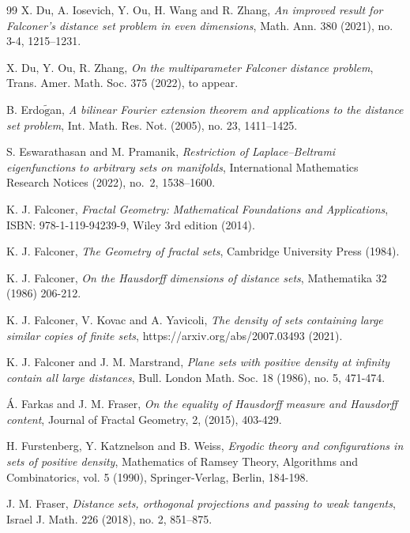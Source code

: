 \documentclass[a4paper,11pt]{amsart}
\numberwithin{equation}{section}
\begin{document}
\begin{thebibliography}{99}
 X. Du, A. Iosevich, Y. Ou, H. Wang and R. Zhang, {\em{An improved result for Falconer's distance set problem in even dimensions}}, Math. Ann. 380 (2021), no. 3-4, 1215–1231. 

 X. Du, Y. Ou, R. Zhang, \textit{On the multiparameter Falconer distance problem}, Trans. Amer. Math. Soc. 375 (2022), to appear. 

 B. Erdo$\tilde{\text{g}}$an, \textit{A bilinear Fourier extension theorem and applications to the distance set problem}, 
Int. Math. Res. Not. (2005), no. 23, 1411–1425. 

 S. Eswarathasan and M. Pramanik, \textit{Restriction of Laplace–Beltrami eigenfunctions to arbitrary sets on manifolds}, International Mathematics Research Notices  (2022), no.~2, 1538–1600.

 K. J. Falconer, \textit{Fractal Geometry: Mathematical Foundations and Applications}, ISBN: 978-1-119-94239-9, Wiley 3rd edition (2014). 

 K. J. Falconer, \textit{The Geometry of fractal sets}, Cambridge University Press (1984). 

 K. J. Falconer, \textit{On the Hausdorff dimensions of distance sets}, Mathematika 32 (1986) 206-212.

 K. J. Falconer, V. Kovac and A. Yavicoli, \textit{The density of sets containing large similar copies of finite sets}, https://arxiv.org/abs/2007.03493 (2021). 

 K. J. Falconer and J. M. Marstrand, \textit{Plane sets with positive density at infinity contain all large distances}, Bull. London
Math. Soc. 18 (1986), no. 5, 471-474.

 \'A. Farkas and J. M. Fraser, {\textit{On the equality of Hausdorff measure and Hausdorff content}}, Journal of Fractal Geometry, 2, (2015), 403-429. 

 H. Furstenberg, Y. Katznelson and B. Weiss, \textit{Ergodic theory and configurations in sets of positive density}, Mathematics
of Ramsey Theory, Algorithms and Combinatorics, vol. 5 (1990), Springer-Verlag, Berlin, 184-198.

 J. M. Fraser, \textit{Distance sets, orthogonal projections and passing to weak tangents}, Israel J. Math. 226 (2018), no. 2, 851–875. 


\end{thebibliography}
\end{document}
